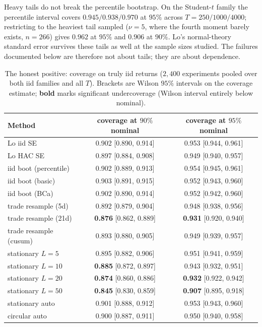\documentclass[11pt]{article}
\begin{document}
Heavy tails do not break the percentile bootstrap. On the Student-$t$ family
the percentile interval covers $0.945/0.938/0.970$ at $95\%$ across
$T=250/1000/4000$; restricting to the heaviest tail sampled ($\nu=5$, where
the fourth moment barely exists, $n=266$) gives $0.962$ at $95\%$ and $0.906$
at $90\%$. Lo's normal-theory standard error survives these tails as well at
the sample sizes studied. The failures documented below are therefore not
about tails; they are about dependence.

\begin{table}[t]
\centering
\caption{The honest positive: coverage on truly iid returns ($2{,}400$
experiments pooled over both iid families and all $T$). Brackets are Wilson
$95\%$ intervals on the coverage estimate; \textbf{bold} marks significant
undercoverage (Wilson interval entirely below nominal).}
\label{tab:iid}
\small
\begin{tabular}{lcc}
\toprule
Method & coverage at $90\%$ nominal & coverage at $95\%$ nominal \\
\midrule
Lo iid SE             & 0.902 [0.890, 0.914] & 0.953 [0.944, 0.961] \\
Lo HAC SE             & 0.897 [0.884, 0.908] & 0.949 [0.940, 0.957] \\
iid boot (percentile) & 0.902 [0.889, 0.913] & 0.954 [0.945, 0.961] \\
iid boot (basic)      & 0.903 [0.891, 0.915] & 0.952 [0.943, 0.960] \\
iid boot (BCa)        & 0.902 [0.890, 0.914] & 0.952 [0.942, 0.960] \\
trade resample (5d)   & 0.892 [0.879, 0.904] & 0.948 [0.938, 0.956] \\
trade resample (21d)  & \textbf{0.876} [0.862, 0.889] & \textbf{0.931} [0.920, 0.940] \\
trade resample (cusum)& 0.893 [0.880, 0.905] & 0.949 [0.939, 0.957] \\
stationary $L{=}5$    & 0.895 [0.882, 0.906] & 0.951 [0.941, 0.959] \\
stationary $L{=}10$   & \textbf{0.885} [0.872, 0.897] & 0.943 [0.932, 0.951] \\
stationary $L{=}20$   & \textbf{0.874} [0.860, 0.886] & \textbf{0.932} [0.922, 0.942] \\
stationary $L{=}50$   & \textbf{0.845} [0.830, 0.859] & \textbf{0.907} [0.895, 0.918] \\
stationary auto       & 0.901 [0.888, 0.912] & 0.953 [0.943, 0.960] \\
circular auto         & 0.900 [0.887, 0.911] & 0.950 [0.940, 0.958] \\
\bottomrule
\end{tabular}
\end{table}
\end{document}
